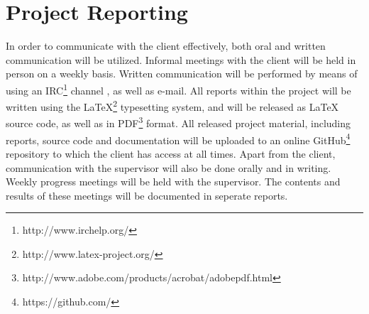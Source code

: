 \section{Project Reporting}
In order to communicate with the client effectively, both oral and written communication will be utilized. Informal meetings with the client will be held in person on a weekly basis. Written communication will be performed by means of using an IRC\footnote{http://www.irchelp.org/} channel , as well as e-mail. All reports within the project will be written using the LaTeX\footnote{http://www.latex-project.org/} typesetting system, and will be released as LaTeX source code, as well as in PDF\footnote{http://www.adobe.com/products/acrobat/adobepdf.html} format. All released project material, including reports, source code and documentation will be uploaded to an online GitHub\footnote{https://github.com/} repository to which the client has access at all times. Apart from the client, communication with the supervisor will also be done orally and in writing. Weekly progress meetings will be held with the supervisor. The contents and results of these meetings will be documented in seperate reports.